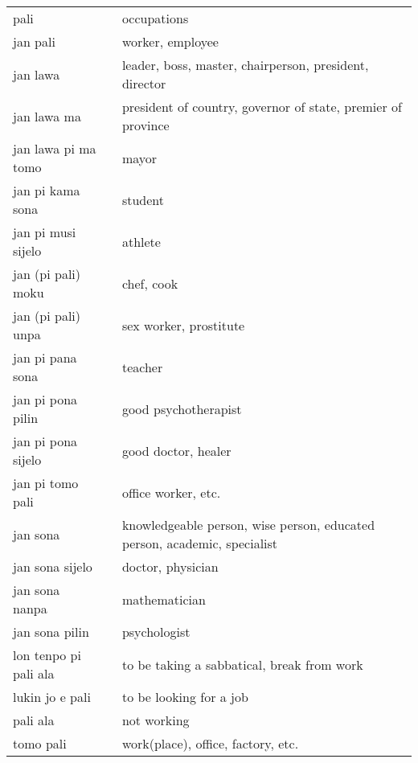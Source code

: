 \begin{supertabular}{p{4,5cm}|ll}
    pali                  &  & occupations                                                              \\
    jan pali              &  & worker, employee                                                         \\
    jan lawa              &  & leader, boss, master, chairperson, president, director                   \\
    jan lawa ma           &  & president of country, governor of state, premier of province             \\
    jan lawa pi ma tomo   &  & mayor                                                                    \\
    jan pi kama sona      &  & student                                                                  \\
    jan pi musi sijelo    &  & athlete                                                                  \\
    jan (pi pali) moku    &  & chef, cook                                                               \\
    jan (pi pali) unpa    &  & sex worker, prostitute                                                   \\
    jan pi pana sona      &  & teacher                                                                  \\
    jan pi pona pilin     &  & good psychotherapist                                                     \\
    jan pi pona sijelo    &  & good doctor, healer                                                      \\
    jan pi tomo pali      &  & office worker, etc.                                                      \\
    jan sona              &  & knowledgeable person, wise person, educated person, academic, specialist \\
    jan sona sijelo       &  & doctor, physician                                                        \\
    jan sona nanpa        &  & mathematician                                                            \\
    jan sona pilin        &  & psychologist                                                             \\
    lon tenpo pi pali ala &  & to be taking a sabbatical, break from work                               \\
    lukin jo e pali       &  & to be looking for a job                                                  \\
    pali ala              &  & not working                                                              \\
    tomo pali             &  & work(place), office, factory, etc.                                       \\
\end{supertabular} \\

